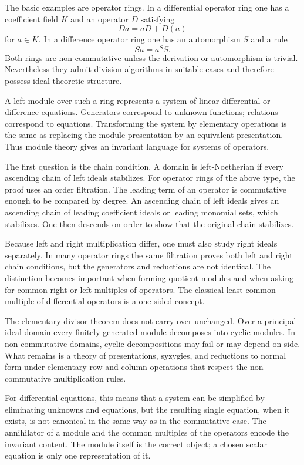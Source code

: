 \documentclass[11pt]{article}
\begin{document}
The basic examples are operator rings. In a differential operator ring one has a coefficient field
\(K\) and an operator \(D\) satisfying \[   D a=aD+D(a) \] for \(a\in K\). In a difference operator
ring one has an automorphism \(S\) and a rule \[   S a=a^S S. \] Both rings are non-commutative
unless the derivation or automorphism is trivial. Nevertheless they admit division algorithms in
suitable cases and therefore possess ideal-theoretic structure.


A left module over such a ring represents a system of linear differential or difference equations.
Generators correspond to unknown functions; relations correspond to equations. Transforming the
system by elementary operations is the same as replacing the module presentation by an equivalent
presentation. Thus module theory gives an invariant language for systems of operators.


The first question is the chain condition. A domain is left-Noetherian if every ascending chain of
left ideals stabilizes. For operator rings of the above type, the proof uses an order filtration.
The leading term of an operator is commutative enough to be compared by degree. An ascending chain
of left ideals gives an ascending chain of leading coefficient ideals or leading monomial sets,
which stabilizes. One then descends on order to show that the original chain stabilizes.


Because left and right multiplication differ, one must also study right ideals separately. In many
operator rings the same filtration proves both left and right chain conditions, but the generators
and reductions are not identical. The distinction becomes important when forming quotient modules
and when asking for common right or left multiples of operators. The classical least common multiple
of differential operators is a one-sided concept.


The elementary divisor theorem does not carry over unchanged. Over a principal ideal domain every
finitely generated module decomposes into cyclic modules. In non-commutative domains, cyclic
decompositions may fail or may depend on side. What remains is a theory of presentations, syzygies,
and reductions to normal form under elementary row and column operations that respect the
non-commutative multiplication rules.


For differential equations, this means that a system can be simplified by eliminating unknowns and
equations, but the resulting single equation, when it exists, is not canonical in the same way as in
the commutative case. The annihilator of a module and the common multiples of the operators encode
the invariant content. The module itself is the correct object; a chosen scalar equation is only one
representation of it.
\end{document}
